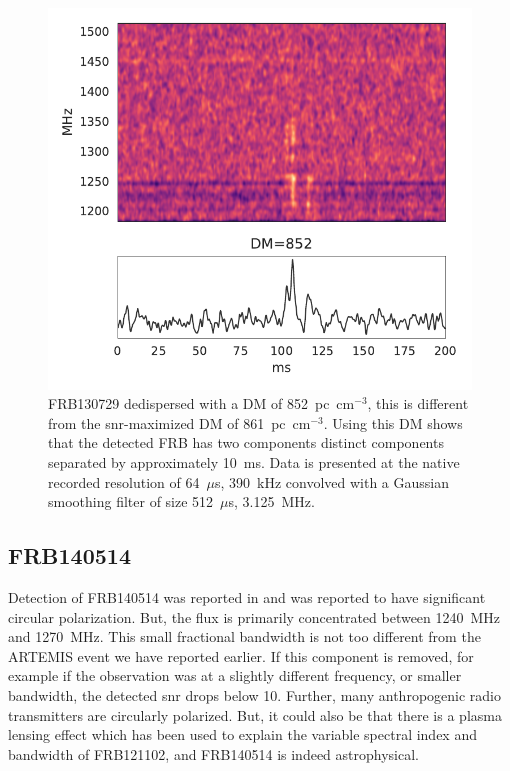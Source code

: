 \documentclass[a4paper,fleqn,usenatbib]{mnras}
\begin{document}
\begin{figure}
    \includegraphics[width=1.0\linewidth]{figures/FRB130729.pdf}
    \caption{FRB130729 dedispersed with a DM of 852~pc~cm$^{-3}$, this is
    different from the \gls{snr}-maximized DM of 861~pc~cm$^{-3}$. Using this DM shows
    that the detected FRB has two components distinct components separated by
    approximately 10~ms. Data is presented at the native recorded resolution of
    64~$\mu$s, 390~kHz convolved with a Gaussian smoothing filter of size
    512~$\mu$s, 3.125~MHz.
    }
    \label{fig:FRB130729}
\end{figure}

\subsection{FRB140514}

Detection of FRB140514 was reported in \citep{2015MNRAS.447..246P} and was
reported to have significant circular polarization. But, the flux is primarily
concentrated between 1240~MHz and 1270~MHz. This small fractional bandwidth is
not too different from the ARTEMIS event we have reported earlier.  If this
component is removed, for example if the observation was at a slightly different
frequency, or smaller bandwidth, the detected \gls{snr} drops below 10.
Further, many anthropogenic radio transmitters are circularly polarized. But,
it could also be that there is a plasma lensing effect
\citep{2017ApJ...842...35C} which has been used to explain the variable spectral
index and bandwidth of FRB121102, and FRB140514 is indeed astrophysical.
\end{document}
